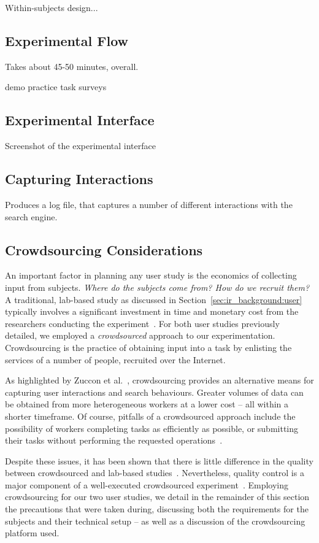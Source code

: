 Within-subjects design...

\subsection{Experimental Flow}\label{sec:csm:methodology:user:flow}

Takes about 45-50 minutes, overall.


demo
practice
task
surveys

\subsection{Experimental Interface}
Screenshot of the experimental interface

\subsection{Capturing Interactions}
Produces a log file, that captures a number of different interactions with the search engine.

\subsection{Crowdsourcing Considerations}
An important factor in planning any user study is the economics of collecting input from subjects. \emph{Where do the subjects come from? How do we recruit them?} A traditional, lab-based study as discussed in Section~\ref{sec:ir_background:user} typically involves a significant investment in time and monetary cost from the researchers conducting the experiment~\citep{spool2001testing}. For both user studies previously detailed, we employed a \emph{crowdsourced} approach to our experimentation. Crowdsourcing is the practice of obtaining input into a task by enlisting the services of a number of people, recruited over the Internet.

As highlighted by Zuccon et al.~\cite{zuccon2013crowdsourcing_comparisons}, crowdsourcing provides an alternative means for capturing user interactions and search behaviours. Greater volumes of data can be obtained from more heterogeneous workers at a lower cost -- all within a shorter timeframe. Of course, pitfalls of a crowdsourced approach include the possibility of workers completing tasks as efficiently as possible, or submitting their tasks without performing the requested operations~\cite{feild2010turkers}.

Despite these issues, it has been shown that there is little difference in the quality between crowdsourced and lab-based studies~\cite{zuccon2013crowdsourcing_comparisons}. Nevertheless, quality control is a major component of a well-executed crowdsourced experiment~\cite{bota2016information_cards}. Employing crowdsourcing for our two user studies, we detail in the remainder of this section the precautions that were taken during, discussing both the requirements for the subjects and their technical setup -- as well as a discussion of the crowdsourcing platform used.

